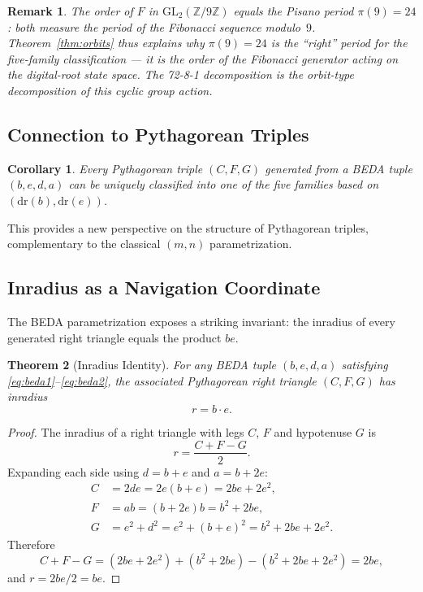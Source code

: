 \documentclass[12pt]{article}
\newtheorem{theorem}{Theorem}
\newtheorem{corollary}[theorem]{Corollary}
\newtheorem{remark}{Remark}
\begin{document}
\begin{remark}
The order of $F$ in $\mathrm{GL}_2(\mathbb{Z}/9\mathbb{Z})$ equals the Pisano period $\pi(9)=24$: both measure the period of the Fibonacci sequence modulo~$9$.  Theorem~\ref{thm:orbits} thus explains \emph{why} $\pi(9)=24$ is the ``right'' period for the five-family classification --- it is the order of the Fibonacci generator acting on the digital-root state space.  The 72-8-1 decomposition is the orbit-type decomposition of this cyclic group action.
\end{remark}

\subsection{Connection to Pythagorean Triples}

\begin{corollary}
Every Pythagorean triple $(C, F, G)$ generated from a BEDA tuple $(b, e, d, a)$ can be uniquely classified into one of the five families based on $(\text{dr}(b), \text{dr}(e))$.
\end{corollary}

This provides a new perspective on the structure of Pythagorean triples, complementary to the classical $(m, n)$ parametrization.

\subsection{Inradius as a Navigation Coordinate}\label{sec:inradius}

The BEDA parametrization exposes a striking invariant: the inradius of every generated right triangle equals the product $be$.

\begin{theorem}[Inradius Identity]\label{thm:inradius}
For any BEDA tuple $(b, e, d, a)$ satisfying \eqref{eq:beda1}--\eqref{eq:beda2}, the associated Pythagorean right triangle $(C, F, G)$ has inradius
\[
  r = b \cdot e.
\]
\end{theorem}

\begin{proof}
The inradius of a right triangle with legs $C$, $F$ and hypotenuse $G$ is
\[
  r = \frac{C + F - G}{2}.
\]
Expanding each side using $d = b+e$ and $a = b+2e$:
\begin{align*}
  C &= 2de = 2e(b+e) = 2be + 2e^2,\\
  F &= ab = (b+2e)b = b^2 + 2be,\\
  G &= e^2 + d^2 = e^2 + (b+e)^2 = b^2 + 2be + 2e^2.
\end{align*}
Therefore
\[
  C + F - G = (2be + 2e^2) + (b^2 + 2be) - (b^2 + 2be + 2e^2) = 2be,
\]
and $r = 2be/2 = be$.
\end{proof}
\end{document}
